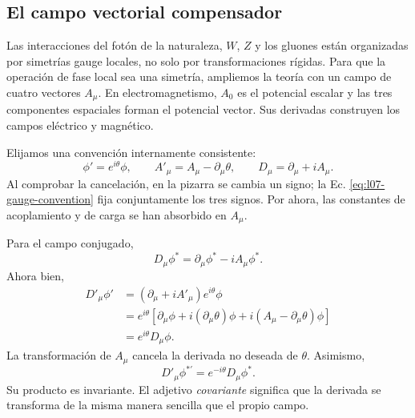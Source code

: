 \subsection{El campo vectorial compensador}

Las interacciones del fotón de la naturaleza, \(W\), \(Z\) y los gluones están organizadas por simetrías gauge locales, no solo por transformaciones rígidas. Para que la operación de fase local sea una simetría, ampliemos la teoría con un campo de cuatro vectores \(A_\mu\). En electromagnetismo, \(A_0\) es el potencial escalar y las tres componentes espaciales forman el potencial vector. Sus derivadas construyen los campos eléctrico y magnético.

Elijamos una convención internamente consistente:
\begin{equation}
  \phi'=e^{i\theta}\phi,
  \qquad
  A'_\mu=A_\mu-\partial_\mu\theta,
  \qquad
  D_\mu=\partial_\mu+iA_\mu.
  \label{eq:l07-gauge-convention}
\end{equation}
Al comprobar la cancelación, en la pizarra se cambia un signo; la Ec.
\eqref{eq:l07-gauge-convention}
fija conjuntamente los tres signos. Por ahora, las constantes de acoplamiento y de carga se han absorbido en \(A_\mu\).

Para el campo conjugado,
\begin{equation}
  D_\mu\phi^*=\partial_\mu\phi^*-iA_\mu\phi^*.
\end{equation}
Ahora bien,
\begin{align}
  D'_\mu\phi'
  &=
  \left(\partial_\mu+iA'_\mu\right)e^{i\theta}\phi
  \nonumber\\
  &=
  e^{i\theta}
  \left[
    \partial_\mu\phi+i(\partial_\mu\theta)\phi
    +i(A_\mu-\partial_\mu\theta)\phi
  \right]
  \nonumber\\
  &=e^{i\theta}D_\mu\phi.
  \label{eq:l07-covariant-transform}
\end{align}
La transformación de \(A_\mu\) cancela la derivada no deseada de \(\theta\). Asimismo,
\begin{equation}
  D'_\mu\phi^{*\prime}=e^{-i\theta}D_\mu\phi^*.
\end{equation}
Su producto es invariante. El adjetivo \emph{covariante} significa que la derivada se transforma de la misma manera sencilla que el propio campo.

